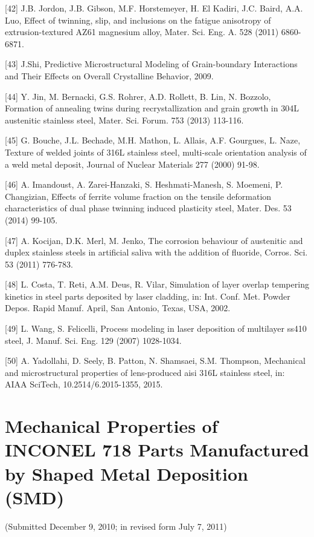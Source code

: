 \documentclass[10pt]{article}
\begin{document}
[42] J.B. Jordon, J.B. Gibson, M.F. Horstemeyer, H. El Kadiri, J.C. Baird, A.A. Luo, Effect of twinning, slip, and inclusions on the fatigue anisotropy of extrusion-textured AZ61 magnesium alloy, Mater. Sci. Eng. A. 528 (2011) 6860-6871.

[43] J.Shi, Predictive Microstructural Modeling of Grain-boundary Interactions and Their Effects on Overall Crystalline Behavior, 2009.

[44] Y. Jin, M. Bernacki, G.S. Rohrer, A.D. Rollett, B. Lin, N. Bozzolo, Formation of annealing twins during recrystallization and grain growth in 304L austenitic stainless steel, Mater. Sci. Forum. 753 (2013) 113-116.

[45] G. Bouche, J.L. Bechade, M.H. Mathon, L. Allais, A.F. Gourgues, L. Naze, Texture of welded joints of 316L stainless steel, multi-scale orientation analysis of a weld metal deposit, Journal of Nuclear Materials 277 (2000) 91-98.

[46] A. Imandoust, A. Zarei-Hanzaki, S. Heshmati-Manesh, S. Moemeni, P. Changizian, Effects of ferrite volume fraction on the tensile deformation characteristics of dual phase twinning induced plasticity steel, Mater. Des. 53 (2014) 99-105.

[47] A. Kocijan, D.K. Merl, M. Jenko, The corrosion behaviour of austenitic and duplex stainless steels in artificial saliva with the addition of fluoride, Corros. Sci. 53 (2011) 776-783.

[48] L. Costa, T. Reti, A.M. Deus, R. Vilar, Simulation of layer overlap tempering kinetics in steel parts deposited by laser cladding, in: Int. Conf. Met. Powder Depos. Rapid Manuf. April, San Antonio, Texas, USA, 2002.

[49] L. Wang, S. Felicelli, Process modeling in laser deposition of multilayer ss410 steel, J. Manuf. Sci. Eng. 129 (2007) 1028-1034.

[50] A. Yadollahi, D. Seely, B. Patton, N. Shamsaei, S.M. Thompson, Mechanical and microstructural properties of lens-produced aisi 316L stainless steel, in: AIAA SciTech, 10.2514/6.2015-1355, 2015.

\section*{Mechanical Properties of INCONEL 718 Parts Manufactured by Shaped Metal Deposition (SMD) }
(Submitted December 9, 2010; in revised form July 7, 2011)
\end{document}
